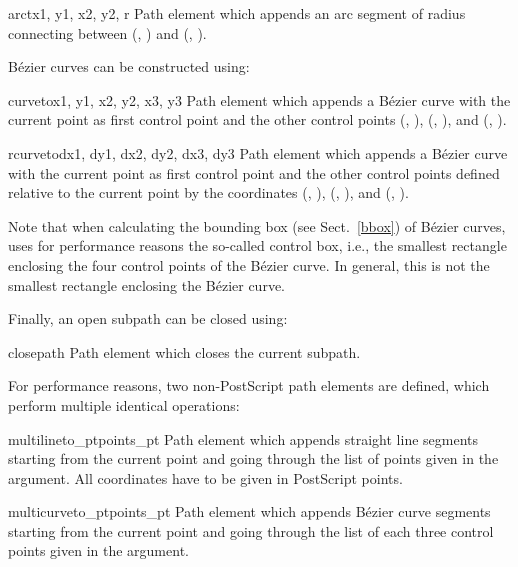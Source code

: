 \begin{classdesc}{arct}{x1, y1, x2, y2, r}
Path element which appends an arc segment of radius 
connecting between (, ) and (, ).\\
\end{classdesc}

B\'ezier curves can be constructed using: \

\begin{classdesc}{curveto}{x1, y1, x2, y2, x3, y3}
Path element which appends a B\'ezier curve with
the current point as first control point and the other control points
(, ), (, ), and (, ). 
\end{classdesc}

\begin{classdesc}{rcurveto}{dx1, dy1, dx2, dy2, dx3, dy3}
Path element which appends a B\'ezier curve with
the current point as first control point and the other control points
defined relative to the current point by the coordinates
(, ), (, ), and (, ). 
\end{classdesc}

Note that when calculating the bounding box (see Sect.~\ref{bbox}) of
B\'ezier curves, \PyX{} uses for performance reasons the so-called
control box, i.e., the smallest rectangle enclosing the four control
points of the B\'ezier curve. In general, this is not the smallest
rectangle enclosing the B\'ezier curve. 

Finally, an open subpath can be closed using:

\begin{classdesc}{closepath}{}
Path element which closes the current subpath. 
\end{classdesc}

For performance reasons, two non-PostScript path elements are defined, 
which perform multiple identical operations:

\begin{classdesc}{multilineto_pt}{points_pt}
Path element which appends straight line segments starting from
the current point and going through the list of points given 
in the  argument. All coordinates have to 
be given in PostScript points. 
\end{classdesc}

\begin{classdesc}{multicurveto_pt}{points_pt}
Path element which appends B\'ezier curve segments starting from
the current point and going through the list of each three control
points given in the  argument. 
\end{classdesc}


